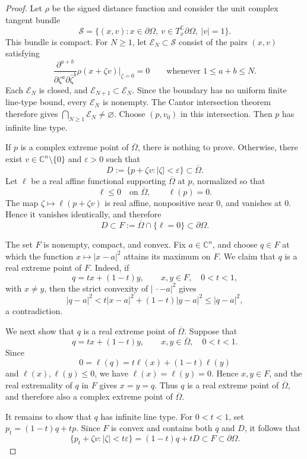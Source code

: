 \documentclass[10pt,a4paper]{amsart}
\newcommand{\C}{\mathbb{C}}
\newcommand{\eps}{\varepsilon}
\begin{document}
\begin{proof}
Let \(\rho\) be the signed distance function and consider the unit complex tangent bundle
\[
\mathcal S
=
\{(x,v):x\in\partial\Omega,\ v\in T_x^{\C}\partial\Omega,\ |v|=1\}.
\]
This bundle is compact.  For \(N\ge1\), let
\(\mathcal E_N\subset\mathcal S\) consist of the pairs \((x,v)\) satisfying
\[
\frac{\partial^{a+b}}
{\partial\zeta^a\partial\bar\zeta^b}
\rho(x+\zeta v)\bigg|_{\zeta=0}=0
\qquad
\text{whenever }1\le a+b\le N.
\]
Each \(\mathcal E_N\) is closed, and
\(\mathcal E_{N+1}\subset\mathcal E_N\).  Since the boundary has no
uniform finite line-type bound, every \(\mathcal E_N\) is nonempty. The Cantor intersection theorem therefore gives
\(\bigcap_{N\ge1}\mathcal E_N\ne\varnothing\).  Choose
\((p,v_0)\) in this intersection.  Then \(p\) has infinite line type.

If \(p\) is a complex extreme point of \(\overline\Omega\), there is
nothing to prove.  Otherwise, there exist
\(v\in\C^n\setminus\{0\}\) and \(\eps>0\)
	such that
	\[
	D:=\{p+\zeta v:|\zeta|<\eps\}\subset\overline\Omega.
	\]
	Let \(\ell\) be a real affine functional supporting
	\(\overline\Omega\) at \(p\), normalized so that
	\[
	\ell\le0\quad\text{on }\overline\Omega,
	\qquad
	\ell(p)=0.
	\]
	The map
	\(\zeta\longmapsto \ell(p+\zeta v)\)
	is real affine, nonpositive near \(0\), and vanishes at \(0\).  Hence it
	vanishes identically, and therefore
	\[
	D\subset
	F:=\overline\Omega\cap\{\ell=0\}
	\subset\partial\Omega.
	\]
	
	The set \(F\) is nonempty, compact, and convex.  Fix \(a\in\C^n\), and
	choose \(q\in F\) at which the function \(x\mapsto|x-a|^2\) attains its
	maximum on \(F\).  We claim that \(q\) is a real extreme point of \(F\).
	Indeed, if
	\[
	q=tx+(1-t)y,
	\qquad
	x,y\in F,\quad 0<t<1,
	\]
	with \(x\ne y\), then the strict convexity of \(|\,\cdot-a|^2\) gives
	\[
	|q-a|^2
	<
	t|x-a|^2+(1-t)|y-a|^2
	\le
	|q-a|^2,
	\]
	a contradiction.
	
	We next show that \(q\) is a real extreme point of
	\(\overline\Omega\).  Suppose that
	\[
	q=tx+(1-t)y,
	\qquad
	x,y\in\overline\Omega,\quad 0<t<1.
	\]
	Since
	\[
	0=\ell(q)=t\ell(x)+(1-t)\ell(y)
	\]
	and \(\ell(x),\ell(y)\le0\), we have
	\(\ell(x)=\ell(y)=0\).  Hence \(x,y\in F\), and the real extremality of
	\(q\) in \(F\) gives \(x=y=q\).  Thus \(q\) is a real extreme point of
	\(\overline\Omega\), and therefore also a complex extreme point of
	\(\overline\Omega\).
	
	It remains to show that \(q\) has infinite line type.  For \(0<t<1\),
	set
	\(p_t=(1-t)q+tp\).
	Since \(F\) is convex and contains both \(q\) and \(D\), it follows that
	\[
	\{p_t+\zeta v:|\zeta|<t\eps\}
	=
	(1-t)q+tD
	\subset F
	\subset\partial\Omega.
	\]
	

\end{proof}
\end{document}
